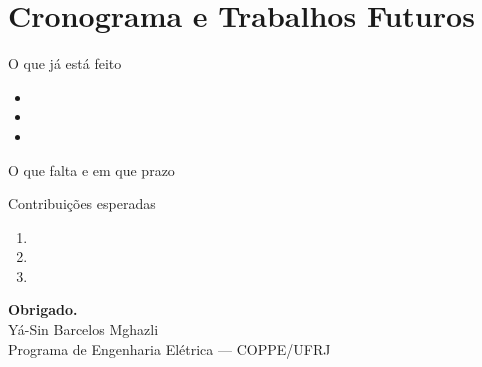
\section{Cronograma e Trabalhos Futuros}

\begin{frame}{O que já está feito}
  \begin{itemize}
    \item {}
    \item {}
    \item {}
  \end{itemize}
\end{frame}

\begin{frame}{O que falta e em que prazo}
  \centering
\end{frame}

\begin{frame}{Contribuições esperadas}
  \begin{enumerate}
    \item {}
    \item {}
    \item {}
  \end{enumerate}
\end{frame}

\begin{frame}[plain]
  \vfill
  \centering
  {\Large\color{peedark}\textbf{Obrigado.}}\\[1.2em]
  {\footnotesize\color{peegray}
   Yá-Sin Barcelos Mghazli\\
   Programa de Engenharia Elétrica --- COPPE/UFRJ}
  \vfill
\end{frame}
